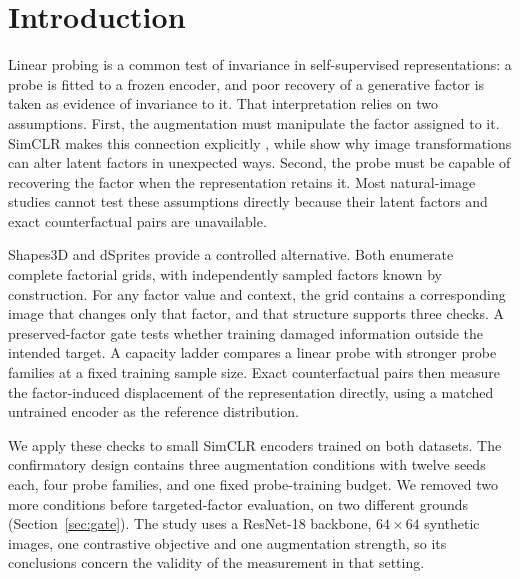 \documentclass[10pt]{article}
\begin{document}
\section{Introduction}
\label{sec:intro}
Linear probing is a common test of invariance in self-supervised representations: a probe is fitted
to a frozen encoder, and poor recovery of a generative factor is taken as evidence of invariance to
it. That interpretation relies on two assumptions. First, the
augmentation must manipulate the factor assigned to it. SimCLR makes this connection explicitly
\citep{chen2020simple}, while \citet{vonkugelgen2021self} show why image transformations can alter
latent factors in unexpected ways. Second, the probe must be capable of recovering the factor when
the representation retains it. Most natural-image studies cannot test these assumptions directly
because their latent factors and exact counterfactual pairs are unavailable.

Shapes3D and dSprites provide a controlled alternative. Both enumerate complete factorial grids,
with independently sampled factors known by construction. For any factor value and context, the grid
contains a corresponding image that changes only that factor, and that structure supports three
checks. A preserved-factor gate tests whether training damaged information outside the intended
target. A capacity ladder compares a linear probe with stronger probe families at a fixed training
sample size. Exact counterfactual pairs then measure the factor-induced displacement of the
representation directly, using a matched untrained encoder as the reference distribution.

We apply these checks to small SimCLR encoders trained on both datasets. The confirmatory design
contains three augmentation conditions with twelve seeds each, four probe families, and one fixed
probe-training budget. We removed two more conditions before targeted-factor evaluation, on two
different grounds (Section~\ref{sec:gate}). The study uses a ResNet-18 backbone, $64\times64$
synthetic images, one contrastive objective and one augmentation strength, so its conclusions
concern the validity of the measurement in that setting.
\end{document}
